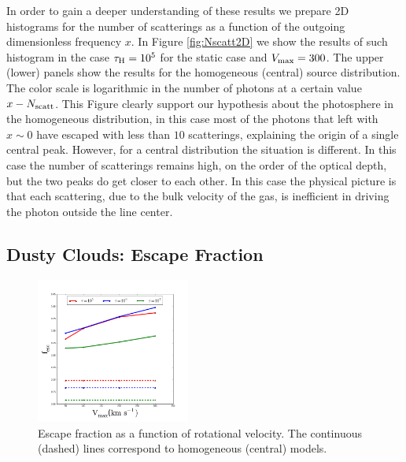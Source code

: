 \documentclass[usenatbib]{mn2e}
\newcommand{\kms}{{\ifmmode{{\mathrm{\,km\ s}^{-1}}}\else{\,km~s$^{-1}$}\fi}}
\begin{document}
In order to gain a deeper understanding of these results we prepare 2D
histograms for the number of scatterings as a function of the outgoing
dimensionless frequency $x$. In Figure \ref{fig:Nscatt2D} we show
the results of such histogram in the case $\tau_{\rm H}=10^5$ for the
static case and $V_{\rm max}=300$\kms. The upper (lower) panels show the
results for the homogeneous (central) source distribution. The color
scale is logarithmic in the number of photons at a certain value
$x-N_{\rm scatt}$. This Figure clearly support our hypothesis about
the photosphere in the homogeneous distribution, in this case most of
the photons that left with $x\sim 0$ have escaped with less than $10$
scatterings, explaining the origin of a single central
peak. However, for a central distribution the situation is
different. In this case the number of scatterings remains high, on the
order of the optical depth, but the two peaks do get closer to each
other. In this case the physical picture is that each scattering, due
to the bulk velocity of the gas, is inefficient in driving the photon
outside the line center.


\subsection{Dusty Clouds: Escape Fraction}
\label{sec:escapefraction}


\begin{figure}
  \includegraphics[width=0.45\textwidth]{escapefraction.png}
   \caption{Escape fraction as a function of rotational velocity. The
     continuous (dashed) lines correspond to homogeneous (central)
     models.
     \label{fig:efvsv}}
\end{figure}
\end{document}

